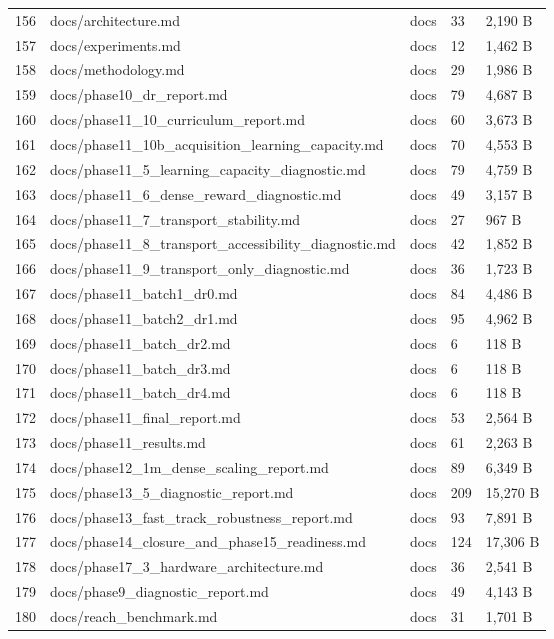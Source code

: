 \documentclass[11pt,a4paper,oneside]{book}
\begin{document}
\begin{longtable}{l l l l l}
156 & docs/architecture.md & docs & 33 & 2,190 B \\
157 & docs/experiments.md & docs & 12 & 1,462 B \\
158 & docs/methodology.md & docs & 29 & 1,986 B \\
159 & docs/phase10\_dr\_report.md & docs & 79 & 4,687 B \\
160 & docs/phase11\_10\_curriculum\_report.md & docs & 60 & 3,673 B \\
161 & docs/phase11\_10b\_acquisition\_learning\_capacity.md & docs & 70 & 4,553 B \\
162 & docs/phase11\_5\_learning\_capacity\_diagnostic.md & docs & 79 & 4,759 B \\
163 & docs/phase11\_6\_dense\_reward\_diagnostic.md & docs & 49 & 3,157 B \\
164 & docs/phase11\_7\_transport\_stability.md & docs & 27 & 967 B \\
165 & docs/phase11\_8\_transport\_accessibility\_diagnostic.md & docs & 42 & 1,852 B \\
166 & docs/phase11\_9\_transport\_only\_diagnostic.md & docs & 36 & 1,723 B \\
167 & docs/phase11\_batch1\_dr0.md & docs & 84 & 4,486 B \\
168 & docs/phase11\_batch2\_dr1.md & docs & 95 & 4,962 B \\
169 & docs/phase11\_batch\_dr2.md & docs & 6 & 118 B \\
170 & docs/phase11\_batch\_dr3.md & docs & 6 & 118 B \\
171 & docs/phase11\_batch\_dr4.md & docs & 6 & 118 B \\
172 & docs/phase11\_final\_report.md & docs & 53 & 2,564 B \\
173 & docs/phase11\_results.md & docs & 61 & 2,263 B \\
174 & docs/phase12\_1m\_dense\_scaling\_report.md & docs & 89 & 6,349 B \\
175 & docs/phase13\_5\_diagnostic\_report.md & docs & 209 & 15,270 B \\
176 & docs/phase13\_fast\_track\_robustness\_report.md & docs & 93 & 7,891 B \\
177 & docs/phase14\_closure\_and\_phase15\_readiness.md & docs & 124 & 17,306 B \\
178 & docs/phase17\_3\_hardware\_architecture.md & docs & 36 & 2,541 B \\
179 & docs/phase9\_diagnostic\_report.md & docs & 49 & 4,143 B \\
180 & docs/reach\_benchmark.md & docs & 31 & 1,701 B \\

\end{longtable}
\end{document}
